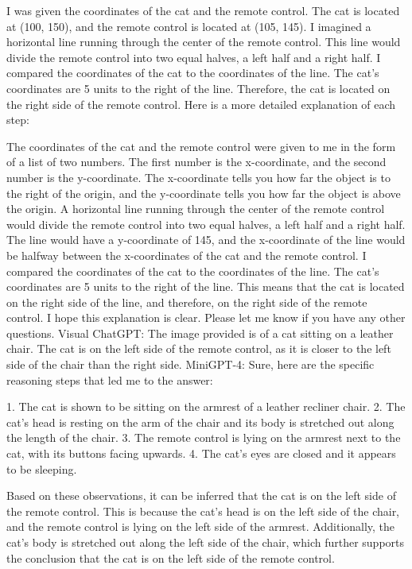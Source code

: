 \begin{enumerate}
        I was given the coordinates of the cat and the remote control. The cat is located at (100, 150), and the remote control is located at (105, 145).
        I imagined a horizontal line running through the center of the remote control. This line would divide the remote control into two equal halves, a left half and a right half.
        I compared the coordinates of the cat to the coordinates of the line. The cat's coordinates are 5 units to the right of the line.
        Therefore, the cat is located on the right side of the remote control.
        Here is a more detailed explanation of each step:

        The coordinates of the cat and the remote control were given to me in the form of a list of two numbers. The first number is the x-coordinate, and the second number is the y-coordinate. The x-coordinate tells you how far the object is to the right of the origin, and the y-coordinate tells you how far the object is above the origin.
        A horizontal line running through the center of the remote control would divide the remote control into two equal halves, a left half and a right half. The line would have a y-coordinate of 145, and the x-coordinate of the line would be halfway between the x-coordinates of the cat and the remote control.
        I compared the coordinates of the cat to the coordinates of the line. The cat's coordinates are 5 units to the right of the line. This means that the cat is located on the right side of the line, and therefore, on the right side of the remote control.
        I hope this explanation is clear. Please let me know if you have any other questions.
        \subitem Visual ChatGPT: The image provided is of a cat sitting on a leather chair. The cat is on the left side of the remote control, as it is closer to the left side of the chair than the right side.
        \subitem MiniGPT-4: Sure, here are the specific reasoning steps that led me to the answer:

        1. The cat is shown to be sitting on the armrest of a leather recliner chair.
        2. The cat’s head is resting on the arm of the chair and its body is stretched out along the length of the chair.
        3. The remote control is lying on the armrest next to the cat, with its buttons facing upwards.
        4. The cat’s eyes are closed and it appears to be sleeping.
        
        Based on these observations, it can be inferred that the cat is on the left side of the remote control. This is because the cat’s head is on the left side of the chair, and the remote control is lying on the left side of the armrest. Additionally, the cat’s body is stretched out along the left side of the chair, which further supports the conclusion that the cat is on the left side of the remote control.
    \end{enumerate}
